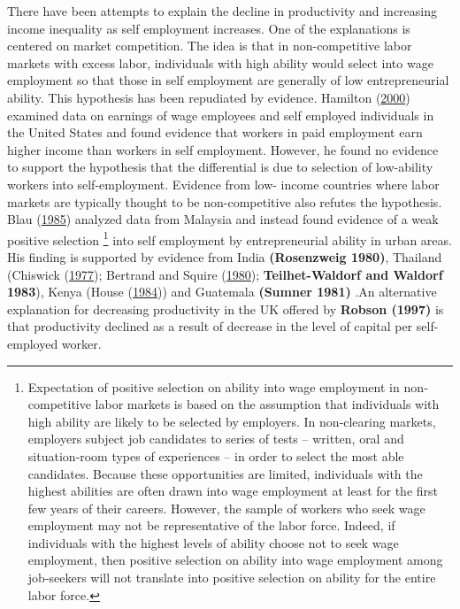 \documentclass[
  a4paper,
  DIV=11,
  numbers=noendperiod]{scrartcl}
\begin{document}
There have been attempts to explain the decline in productivity and
increasing income inequality as self employment increases. One of the
explanations is centered on market competition. The idea is that in
non-competitive labor markets with excess labor, individuals with high
ability would select into wage employment so that those in self
employment are generally of low entrepreneurial ability. This hypothesis
has been repudiated by evidence. Hamilton
(\protect\hyperlink{ref-hamilton2000}{2000}) examined data on earnings
of wage employees and self employed individuals in the United States and
found evidence that workers in paid employment earn higher income than
workers in self employment. However, he found no evidence to support the
hypothesis that the differential is due to selection of low-ability
workers into self-employment. Evidence from low- income countries where
labor markets are typically thought to be non-competitive also refutes
the hypothesis. Blau (\protect\hyperlink{ref-blau1985}{1985}) analyzed
data from Malaysia and instead found evidence of a weak positive
selection \footnote{Expectation of positive selection on ability into
  wage employment in non‐competitive labor markets is based on the
  assumption that individuals with high ability are likely to be
  selected by employers. In non‐clearing markets, employers subject job
  candidates to series of tests -- written, oral and situation‐room
  types of experiences -- in order to select the most able candidates.
  Because these opportunities are limited, individuals with the highest
  abilities are often drawn into wage employment at least for the first
  few years of their careers. However, the sample of workers who seek
  wage employment may not be representative of the labor force. Indeed,
  if individuals with the highest levels of ability choose not to seek
  wage employment, then positive selection on ability into wage
  employment among job‐seekers will not translate into positive
  selection on ability for the entire labor force.} into self employment
by entrepreneurial ability in urban areas. His finding is supported by
evidence from India \textbf{(Rosenzweig 1980)}, Thailand (Chiswick
(\protect\hyperlink{ref-chiswick1977}{1977}); Bertrand and Squire
(\protect\hyperlink{ref-bertrand1980}{1980}); \textbf{Teilhet-Waldorf
and Waldorf 1983}), Kenya (House
(\protect\hyperlink{ref-house1984}{1984})) and Guatemala \textbf{(Sumner
1981)} .An alternative explanation for decreasing productivity in the UK
offered by \textbf{Robson (1997)} is that productivity declined as a
result of decrease in the level of capital per self-employed worker.
\end{document}
